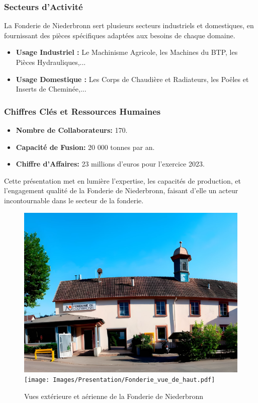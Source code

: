 \documentclass[12pt]{article}
\begin{document}
\subsubsection*{Secteurs d'Activité}
\sloppy
La Fonderie de Niederbronn sert plusieurs secteurs industriels et domestiques, 
en fournissant des pièces spécifiques adaptées aux besoins de chaque domaine.
\begin{itemize}
    \item \textbf{Usage Industriel :} Le Machinisme Agricole, les Machines du BTP, les Pièces Hydrauliques,...
    \item \textbf{Usage Domestique :} Les Corps de Chaudière et Radiateurs, les Poêles et Inserts de Cheminée,...
\end{itemize}

\subsubsection*{Chiffres Clés et Ressources Humaines}
\begin{itemize}
    \item \textbf{Nombre de Collaborateurs:} 170.
    \item \textbf{Capacité de Fusion:} 20 000 tonnes par an.
    \item \textbf{Chiffre d'Affaires:} 23 millions d'euros pour l'exercice 2023.
\end{itemize}


\sloppy
Cette présentation met en lumière l'expertise, les capacités de production,
et l'engagement qualité de la Fonderie de Niederbronn, faisant d'elle un acteur 
incontournable dans le secteur de la fonderie.


\begin{figure}[H]
    \centering
    \vfill
    \includegraphics[scale=0.27]{Images/Presentation/Fonderie_vue_de_bas.pdf}
    \hspace{0.5 cm}
    \texttt{[image: Images/Presentation/Fonderie\_vue\_de\_haut.pdf]}
    \caption{Vues extérieure et aérienne de la Fonderie de Niederbronn}
\end{figure}
\end{document}
